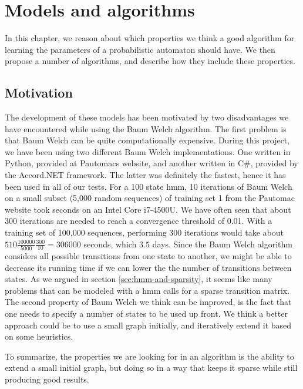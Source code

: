 \chapter{Models and algorithms}
In this chapter, we reason about which properties we think a good algorithm for learning the parameters of a probabilistic automaton should have.
We then propose a number of algorithms, and describe how they include these properties.

\section{Motivation}
The development of these models has been motivated by two disadvantages we have encountered while using the Baum Welch algorithm.
The first problem is that Baum Welch can be quite computationally expensive.
During this project, we have been using two different Baum Welch implementations. One written in Python, provided at Pautomacs website, and another written in C\#, provided by the Accord.NET framework. The latter was definitely the fastest, hence it has been used in all of our tests.
For a 100 state \gls{hmm}, 10 iterations of Baum Welch on a small subset (5,000 random sequences) of training set 1 from the Pautomac website took  seconds on an Intel Core i7-4500U. We have often seen that about 300 iterations are needed to reach a convergence threshold of 0.01. With a training set of 100,000 sequences, performing 300 iterations would take about $510\frac{100000}{5000}\frac{300}{10} = 306000$ seconds, which $3.5$ days.
Since the Baum Welch algorithm considers all possible transitions from one state to another, we might be able to decrease its running time if we can lower the the number of transitions between states. As we argued in section \ref{sec:hmm-and-sparsity}, it seems like many problems that can be modeled with a \gls{hmm} calls for a sparse transition matrix.
The second property of Baum Welch we think can be improved, is the fact that one needs to specify a number of states to be used up front.
We think a better approach could be to use a small graph initially, and iteratively extend it based on some heuristics.

To summarize, the properties we are looking for in an algorithm is the ability to extend a small initial graph, but doing so in a way that keeps it sparse while still producing good results.




